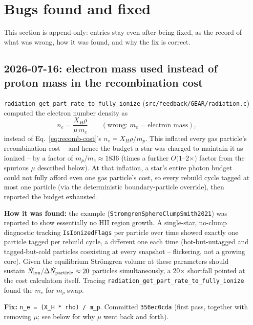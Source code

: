 \section{Bugs found and fixed}
\label{sec:bugs}

This section is append-only: entries stay even after being fixed, as
the record of what was wrong, how it was found, and why the fix is
correct.

\subsection{2026-07-16: electron mass used instead of proton mass in the recombination cost}
\label{sec:mass-bug}

\texttt{radiation\_get\_part\_rate\_to\_fully\_ionize}
(\texttt{src/feedback/GEAR/radiation.c}) computed the electron number
density as
\begin{equation}
  n_e = \frac{X_H \rho}{\mu\, m_e} \qquad (\text{wrong: } m_e = \text{electron mass}),
\end{equation}
instead of Eq.~\ref{eq:recomb-cost}'s $n_e = X_H\rho/m_p$. This
inflated every gas particle's recombination cost -- and hence the
budget a star was charged to maintain it as ionized -- by a factor of
$m_p/m_e \approx 1836$ (times a further $O(1$--$2\times)$ factor from
the spurious $\mu$ described below). At that inflation, a star's
entire photon budget could not fully afford even one gas particle's
cost, so every rebuild cycle tagged at most one particle (via the
deterministic boundary-particle override), then reported the budget
exhausted.

\textbf{How it was found:} the example
(\texttt{StromgrenSphereClumpSmith2021}) was reported to show
essentially no HII region growth. A single-star, no-clump diagnostic
tracking \texttt{IsIonizedFlags} per particle over time showed exactly
one particle tagged per rebuild cycle, a different one each time
(hot-but-untagged and tagged-but-cold particles coexisting at every
snapshot -- flickering, not a growing core). Given the equilibrium
Str\"omgren volume at these parameters should sustain
$\dot N_{\rm ion}/\Delta\dot N_{\rm particle} \approx 20$ particles
simultaneously, a 20$\times$ shortfall pointed at the cost calculation
itself. Tracing \texttt{radiation\_get\_part\_rate\_to\_fully\_ionize}
found the $m_e$-for-$m_p$ swap.

\textbf{Fix:} \texttt{n\_e = (X\_H * rho) / m\_p}. Committed
\texttt{356ec0cda} (first pass, together with removing $\mu$; see
below for why $\mu$ went back and forth).

